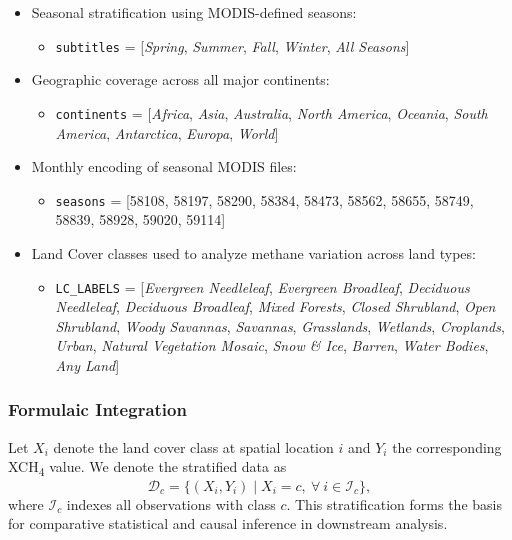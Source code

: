 \begin{itemize}
	\item Seasonal stratification using MODIS-defined seasons:
	      \begin{itemize}
		      \item \texttt{subtitles} = [\textit{Spring}, \textit{Summer}, \textit{Fall}, \textit{Winter}, \textit{All Seasons}]
	      \end{itemize}
	\item Geographic coverage across all major continents:
	      \begin{itemize}
		      \item \texttt{continents} = [\textit{Africa}, \textit{Asia}, \textit{Australia}, \textit{North America}, \textit{Oceania}, \textit{South America}, \textit{Antarctica}, \textit{Europa}, \textit{World}]
	      \end{itemize}
	\item Monthly encoding of seasonal MODIS files:
	      \begin{itemize}
		      \item \texttt{seasons} = [58108, 58197, 58290, 58384, 58473, 58562, 58655, 58749, 58839, 58928, 59020, 59114]
	      \end{itemize}
	\item Land Cover classes used to analyze methane variation across land types:
	      \begin{itemize}
		      \item \texttt{LC\_LABELS} = [\textit{Evergreen Needleleaf}, \textit{Evergreen Broadleaf}, \textit{Deciduous Needleleaf}, \textit{Deciduous Broadleaf}, \textit{Mixed Forests}, \textit{Closed Shrubland}, \textit{Open Shrubland}, \textit{Woody Savannas}, \textit{Savannas}, \textit{Grasslands}, \textit{Wetlands}, \textit{Croplands}, \textit{Urban}, \textit{Natural Vegetation Mosaic}, \textit{Snow \& Ice}, \textit{Barren}, \textit{Water Bodies}, \textit{Any Land}]
	      \end{itemize}
\end{itemize}

\subsubsection{Formulaic Integration}
Let $X_{i}$ denote the land cover class at spatial location $i$ and $Y_{i}$ the corresponding XCH\textsubscript{4} value. We denote the stratified data as
\begin{equation}
	\mathcal{D}_c = \{ (X_{i}, Y_{i}) \mid X_{i} = c,\ \forall\ i \in \mathcal{I}_c \},
\end{equation}
where $\mathcal{I}_c$ indexes all observations with class $c$. This stratification forms the basis for comparative statistical and causal inference in downstream analysis.

